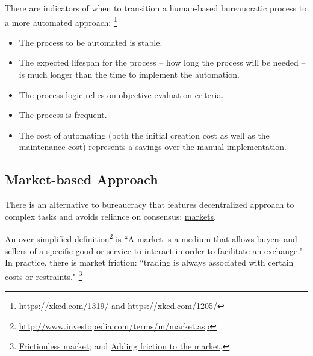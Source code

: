 There are indicators of when to transition a human-based bureaucratic process to a more automated approach:
\footnote{\href{https://xkcd.com/1319/}{https://xkcd.com/1319/} and \href{https://xkcd.com/1205/}{https://xkcd.com/1205/}}
\begin{itemize}
    \item The process to be automated is stable.
    \item The expected lifespan for the process -- how long the process will be needed -- is much longer than the time to implement the automation.
\item The process logic relies on objective evaluation criteria.  
\item The process is frequent.
\item The cost of automating (both the initial creation cost as well as the maintenance cost) represents a savings over the manual implementation.
\end{itemize}


\subsection*{Market-based Approach}

There is an alternative to bureaucracy that features decentralized approach to complex tasks and avoids reliance on consensus: \href{https://en.wikipedia.org/wiki/Market_(economics)}{markets}.

An over-simplified definition\footnote{\href{http://www.investopedia.com/terms/m/market.asp}{http://www.investopedia.com/terms/m/market.asp}} is ``A market is a medium that allows buyers and sellers of a specific good or service to interact in order to facilitate an exchange." 
In practice, there is market friction: ``trading is always associated with certain costs or restraints."
\footnote{\href{http://www.investopedia.com/terms/f/frictionlessmarket.asp}{Frictionless market};
and \href{https://insight.kellogg.northwestern.edu/article/adding_friction_to_the_market}{Adding friction to the market}.}

